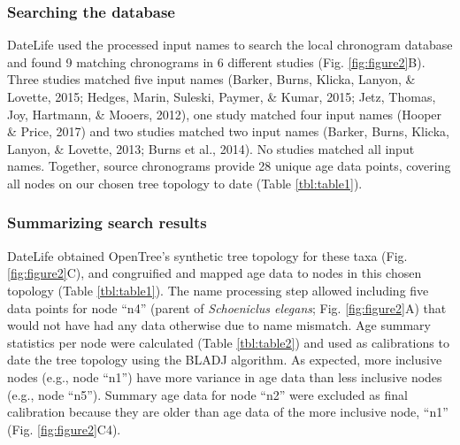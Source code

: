 \documentclass[english,man]{apa6}
\begin{document}
\newpage

\hypertarget{searching-the-database}{%
\subsubsection{Searching the database}\label{searching-the-database}}

DateLife used the processed input names to search the local chronogram database and found 9 matching chronograms in 6 different studies (Fig. \ref{fig:figure2}B). Three studies matched five input names (Barker, Burns, Klicka, Lanyon, \& Lovette, 2015; Hedges, Marin, Suleski, Paymer, \& Kumar, 2015; Jetz, Thomas, Joy, Hartmann, \& Mooers, 2012), one study matched four input names (Hooper \& Price, 2017) and two studies matched two input names (Barker, Burns, Klicka, Lanyon, \& Lovette, 2013; Burns et al., 2014). No studies matched all input names. Together, source chronograms provide 28 unique age data points, covering all nodes on our chosen tree topology to date (Table \ref{tbl:table1}).

\vspace{3mm}

\hypertarget{summarizing-search-results-1}{%
\subsubsection{Summarizing search results}\label{summarizing-search-results-1}}

DateLife obtained OpenTree's synthetic tree topology for these taxa (Fig. \ref{fig:figure2}C), and congruified and mapped age data to nodes in this chosen topology (Table \ref{tbl:table1}).
The name processing step allowed including five data points for node \enquote{n4} (parent of \emph{Schoeniclus elegans}; Fig. \ref{fig:figure2}A) that would not have had any data otherwise due to name mismatch.
Age summary statistics per node were calculated (Table \ref{tbl:table2}) and used as calibrations to date the tree topology using the BLADJ algorithm.
As expected, more inclusive nodes (e.g., node \enquote{n1}) have more variance in age data than less inclusive nodes (e.g., node \enquote{n5}).
Summary age data for node \enquote{n2} were excluded as final calibration because they are older than age data of the more inclusive node, \enquote{n1} (Fig. \ref{fig:figure2}C4).

\newpage
\end{document}
